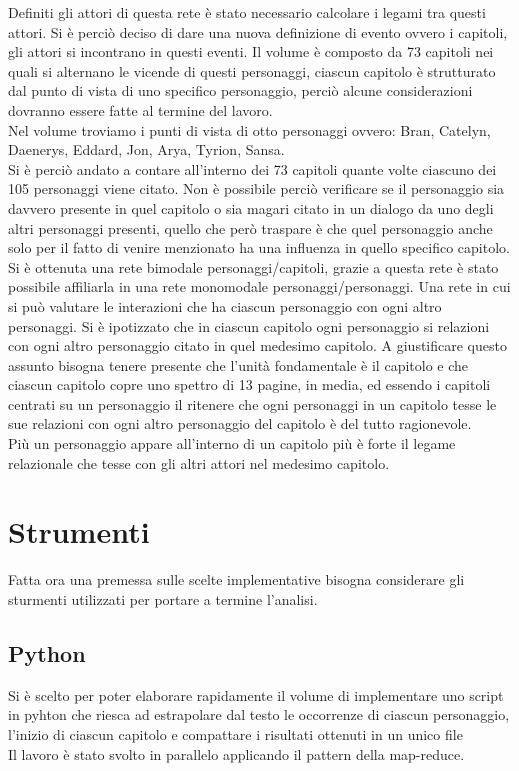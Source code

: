 \documentclass[a4paper]{article}
\begin{document}
Definiti gli attori di questa rete è stato necessario calcolare i legami tra questi attori. Si è perciò deciso di dare una nuova definizione di evento ovvero i capitoli, gli attori si incontrano in questi eventi. Il volume è composto da 73 capitoli nei quali si alternano le vicende di questi personaggi, ciascun capitolo è strutturato dal punto di vista di uno specifico personaggio, perciò alcune considerazioni dovranno essere fatte al termine del lavoro.\\
Nel volume troviamo i punti di vista di otto personaggi ovvero: Bran, Catelyn, Daenerys, Eddard, Jon, Arya, Tyrion, Sansa.\\
Si è perciò andato a contare all'interno dei 73 capitoli quante volte ciascuno dei 105 personaggi viene citato. Non è possibile perciò verificare se il personaggio sia davvero presente in quel capitolo o sia magari citato in un dialogo da uno degli altri personaggi presenti, quello che però traspare è che quel personaggio anche solo per il fatto di venire menzionato ha una influenza in quello specifico capitolo.\\
Si è ottenuta una rete bimodale personaggi/capitoli, grazie a questa rete è stato possibile affiliarla in una rete monomodale personaggi/personaggi. Una rete in cui si può valutare le interazioni che ha ciascun personaggio con ogni altro personaggi. Si è ipotizzato che in ciascun capitolo ogni personaggio si relazioni con ogni altro personaggio citato in quel medesimo capitolo. A giustificare questo assunto bisogna tenere presente che l'unità fondamentale è il capitolo e che ciascun capitolo copre uno spettro di 13 pagine, in media, ed essendo i capitoli centrati su un personaggio il ritenere che ogni personaggi in un capitolo tesse le sue relazioni con ogni altro personaggio del capitolo è del tutto ragionevole.\\ 
Più un personaggio appare all'interno di un capitolo più è forte il legame relazionale che tesse con gli altri attori nel medesimo capitolo.

\section{Strumenti}
Fatta ora una premessa sulle scelte implementative bisogna considerare gli sturmenti utilizzati per portare a termine l'analisi.\\

\subsection{Python}
Si è scelto per poter elaborare rapidamente il volume di implementare uno script in pyhton che riesca ad estrapolare dal testo le occorrenze di ciascun personaggio, l'inizio di ciascun capitolo e compattare i risultati ottenuti in un unico file\\
Il lavoro è stato svolto in parallelo applicando il pattern della map-reduce.
\end{document}
